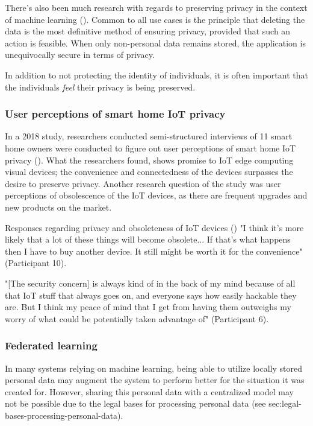 There's also been much research with regards to preserving privacy in the context of machine learning (\cite{ra2023visual_privacy_techniques}). Common to all use cases is the principle that deleting the data is the most definitive method of ensuring privacy, provided that such an action is feasible. When only non-personal data remains stored, the application is unequivocally secure in terms of privacy.

In addition to not protecting the identity of individuals, it is often important that the individuals \textit{feel} their privacy is being preserved.

\subsubsection{User perceptions of smart home IoT privacy}
\label{sec:smarthomeprivacy}

In a 2018 study, researchers conducted semi-structured interviews of 11 smart home owners were conducted to figure out user perceptions of smart home IoT privacy (\citeauthor{zh2018userperceptionsofIoTPrivacy}). What the researchers found, shows promise to IoT edge computing visual devices; the convenience and connectedness of the devices surpasses the desire to preserve privacy. Another research question of the study was user perceptions of obsolescence of the IoT devices, as there are frequent upgrades and new products on the market.

\begin{myquote}{Responses regarding privacy and obsoleteness of IoT devices (\cite{zh2018userperceptionsofIoTPrivacy})}
    "I think it’s more likely that a lot of these things will become obsolete... If that’s what happens then I have to buy another device. It still might be worth it for the convenience" (Participant 10).

    "[The security concern] is always kind of in the back of my mind because of all that IoT stuff that always goes on, and everyone says how easily hackable they are. But I think my peace of mind that I get from having them outweighs my worry of what could be potentially taken advantage of" (Participant 6).
\end{myquote}

\subsubsection{Federated learning}
\label{sec:federated_learning}
In many systems relying on machine learning, being able to utilize locally stored personal data may augment the system to perform better for the situation it was created for. However, sharing this personal data with a centralized model may not be possible due to the legal bases for processing personal data (see sec:legal-bases-processing-personal-data).

